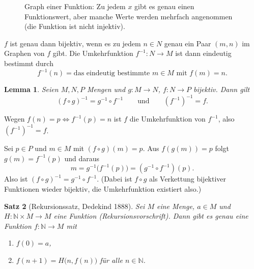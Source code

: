 \documentclass[a4paper]{article}
\makeatletter
\theoremstyle{kurzskript}
\newtheorem{satz}{Satz}[section]             %
\newtheorem{lemma}[satz]{Lemma}
\renewenvironment{proof}[1][\proofname]{\par\pushQED{\qed}%
  \normalfont\topsep\medskipamount\relax
  \trivlist\item[\hskip\labelsep\bfseries #1\@addpunct{.}]\ignorespaces}%
  {\popQED\endtrivlist\@endpefalse}
\renewcommand{\proofname}{Beweis}
\newcommand{\N}{\mathbb{N}}
\makeatother
\begin{document}
\begin{figure}[H]
\centering
{}
\caption{Graph einer Funktion: Zu jedem $x$ gibt es genau einen Funktionswert, aber manche Werte werden mehrfach angenommen (die Funktion ist nicht injektiv).}
\end{figure}

$f$ ist genau dann bijektiv, wenn es zu jedem $n \in N$ genau ein Paar $(m, n)$ im Graphen von $f$ gibt. Die Umkehrfunktion $f^{-1}\colon N \to M$ ist dann eindeutig bestimmt durch
\[
  f^{-1}(n) = \text{das eindeutig bestimmte } m \in M \text{ mit } f(m) = n.
\]

\begin{lemma}
Seien $M, N, P$ Mengen und $g\colon M \to N$, $f\colon N \to P$ bijektiv. Dann gilt
\[
  (f \circ g)^{-1} = g^{-1} \circ f^{-1} \qquad\text{und}\qquad (f^{-1})^{-1} = f.
\]
\end{lemma}

\begin{proof}
Wegen $f(n) = p \iff f^{-1}(p) = n$ ist $f$ die Umkehrfunktion von $f^{-1}$, also $(f^{-1})^{-1} = f$.

Sei $p \in P$ und $m \in M$ mit $(f \circ g)(m) = p$. Aus $f(g(m)) = p$ folgt $g(m) = f^{-1}(p)$ und daraus
\[
  m = g^{-1}\bigl(f^{-1}(p)\bigr) = (g^{-1} \circ f^{-1})(p).
\]
Also ist $(f \circ g)^{-1} = g^{-1} \circ f^{-1}$. (Dabei ist $f \circ g$ als Verkettung bijektiver Funktionen wieder bijektiv, die Umkehrfunktion existiert also.)
\end{proof}

\begin{satz}[Rekursionssatz, Dedekind 1888]\label{satz:rekursion}
Sei $M$ eine Menge, $a \in M$ und $H\colon \N \times M \to M$ eine Funktion (\emph{Rekursionsvorschrift}). Dann gibt es genau eine Funktion $f\colon \N \to M$ mit
\begin{enumerate}[label=(\arabic*)]
  \item $f(0) = a$,
  \item $f(n + 1) = H\bigl(n, f(n)\bigr)$ für alle $n \in \N$.
\end{enumerate}
\end{satz}
\end{document}

